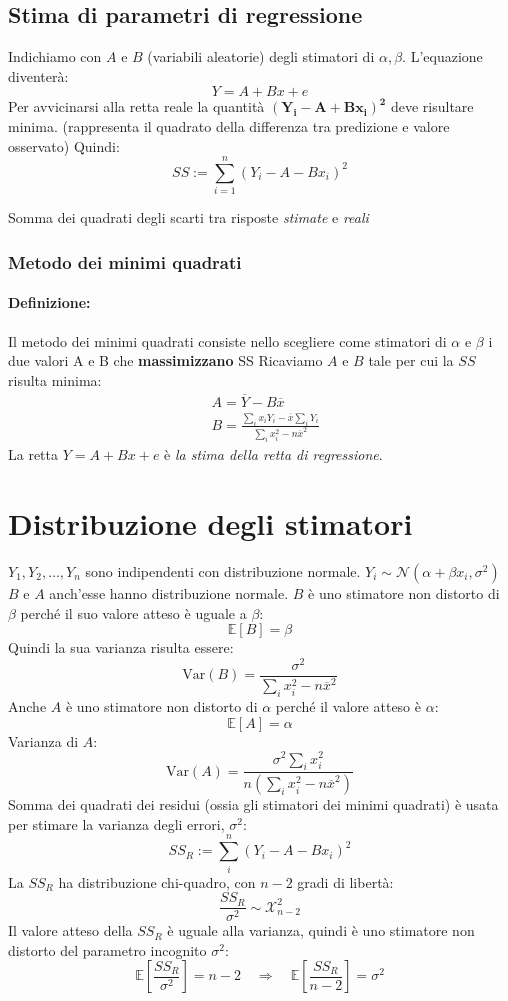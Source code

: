 \documentclass[]{article}
\newcommand{\ev}{\mathbb{E}[X]}
\renewcommand{\ev}[1]{\mathbb{E}\left[#1\right]}
\newcommand{\definizione}{\paragraph{Definizione:}}
\begin{document}
    \subsection{Stima di parametri di regressione}
    Indichiamo con $A$ e $B$ (variabili aleatorie) degli stimatori di $\alpha, \beta$.
    L'equazione diventerà:
    \[ Y = A + Bx + e \]
    Per avvicinarsi alla retta reale la quantità $\boldsymbol{(Y_i - A + Bx_i)^2}$ deve risultare minima.
    (rappresenta il quadrato della differenza tra predizione e valore osservato)
    Quindi:
    \[ SS := \sum_{i = 1}^{n}(Y_i-A-Bx_i)^2 \]
    \centerline{Somma dei quadrati degli scarti tra risposte \textit{stimate} e \textit{reali}}
    \subsubsection{Metodo dei minimi quadrati}
    \definizione Il metodo dei minimi quadrati consiste nello scegliere come stimatori di $\alpha$ e $\beta$ i due valori A e B che \textbf{massimizzano} SS
    Ricaviamo $A$ e $B$ tale per cui la $SS$ risulta minima:
    \begin{equation*}
        \begin{split}
            &A = \overline Y - B \overline x \\
            &B = \frac{\sum_ix_iY_i - \overline{x}\sum_i Y_i }{\sum_i x_i^2 - n \overline x^2}
        \end{split}
    \end{equation*}
    La retta $Y = A + Bx + e$ è \emph{la stima della retta di regressione}.   
    \section{Distribuzione degli stimatori}
    $Y_1, Y_2, \ldots, Y_n$ sono indipendenti con distribuzione normale. $Y_i \sim \mathcal N(\alpha + \beta x_i, \sigma^2)$
    $B$ e $A$ anch'esse hanno distribuzione normale.
    $B$ è uno stimatore non distorto di $\beta$ perché il suo valore atteso è uguale a $\beta$:
    \[ \ev{B} = \beta \]
    Quindi la sua varianza risulta essere:
    \[\text{Var}(B) = \frac{\sigma^2}{\sum_i x^2_i -n\overline x^2}\]
    Anche $A$ è uno stimatore non distorto di $\alpha$ perché il valore atteso è $\alpha$:
    \[  \ev{A} = \alpha \]
    Varianza di $A$:
    \[ \text{Var}(A) = \frac{\sigma^2 \sum_i x_i^2}{n(\sum_i x_i^2 - n \overline x^2)} \]
    Somma dei quadrati dei residui (ossia gli stimatori dei minimi quadrati) è usata per stimare la varianza degli errori, $\sigma^2$:
    \[ SS_R := \sum_i^n(Y_i - A - Bx_i)^2 \]
    La $SS_R$ ha distribuzione chi-quadro, con $n-2$ gradi di libertà:
    \[ \frac{SS_R}{\sigma^2} \sim \mathcal{X}^2_{n-2} \]
    Il valore atteso della $SS_R$ è uguale alla varianza, quindi è uno stimatore non distorto del parametro incognito $\sigma^2$:
    \[ \ev{\frac{SS_R}{\sigma^2}} = n - 2 \quad \Rightarrow \quad \ev{\frac{SS_R}{n-2}} = \sigma^2\] 
\end{document}
